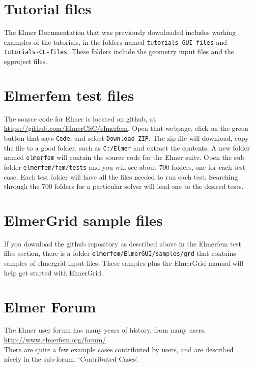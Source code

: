 \section{Tutorial files}

The Elmer Documentation that was previously downloaded includes working examples of the tutorials, in the folders named  \texttt{tutorials-GUI-files} and  \texttt{tutorials-CL-files}.  These folders include the geometry input files and the egproject files.

\section{Elmerfem test files}

The source code for Elmer is located on github, at \url{https://github.com/ElmerCSC/elmerfem}.  Open that webpage, click on the green button that says \texttt{Code}, and select \texttt{Download ZIP}.  The zip file will download, copy the file to a good folder, such as \texttt{C:/Elmer} and extract the contents.  A new folder named \texttt{elmerfem} will contain the source code for the Elmer suite.  Open the sub folder \texttt{elmerfem/fem/tests} and you will see about 700 folders, one for each test case.  Each test folder will have all the files needed to run each test.  Searching through the 700 folders for a particular solver will lead one to the desired tests.

\section{ElmerGrid sample files}

If you download the github repository as described above in the Elmerfem test files section, there is a folder \texttt{elmerfem/ElmerGUI/samples/grd} that contains samples of elmergrid input files.  These samples plus the ElmerGrid manual will help get started with ElmerGrid.

\section{Elmer Forum}

The Elmer user forum has many years of history, from many users.\\

\url{http://www.elmerfem.org/forum/}\\

There are quite a few example cases contributed by users, and are described nicely in the sub-forum, `Contributed Cases'.

